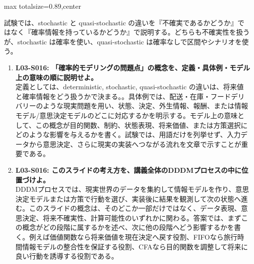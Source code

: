 \begin{minipage}[t]{0.58\textwidth}
\begin{adjustbox}{max totalsize={\textwidth}{0.89\textheight},center}
\begin{minipage}{\textwidth}
試験では、stochastic と quasi-stochastic の違いを『不確実であるかどうか』ではなく『確率情報を持っているかどうか』で説明する。どちらも不確実性を扱うが、stochastic は確率を使い、quasi-stochastic は確率なしで区間やシナリオを使う。\par{}\begin{enumerate}\item \textbf{L03-S016: 「確率的モデリングの問題点」の概念を、定義・具体例・モデル上の意味の順に説明せよ。}\\定義としては、deterministic, stochastic, quasi-stochastic の違いは、将来値と確率情報をどう扱うかで決まる。。具体例では、配送・在庫・フードデリバリーのような現実問題を用い、状態、決定、外生情報、報酬、または情報モデル/意思決定モデルのどこに対応するかを明示する。モデル上の意味として、この概念が目的関数、制約、状態表現、将来価値、または方策選択にどのような影響を与えるかを書く。試験では、用語だけを列挙せず、入力データから意思決定、さらに現実の実装へつながる流れを文章で示すことが重要である。\item \textbf{L03-S016: このスライドの考え方を、講義全体のDDDMプロセスの中に位置づけよ。}\\DDDMプロセスでは、現実世界のデータを集約して情報モデルを作り、意思決定モデルまたは方策で行動を選び、実装後に結果を観測して次の状態へ進む。このスライドの概念は、そのどこか一部だけではなく、データ表現、意思決定、将来不確実性、計算可能性のいずれかに関わる。答案では、まずこの概念がどの段階に属するかを述べ、次に他の段階へどう影響するかを書く。例えば価値関数なら将来価値を現在決定へ戻す役割、FIFOなら旅行時間情報モデルの整合性を保証する役割、CFAなら目的関数を調整して将来に良い行動を誘導する役割である。\end{enumerate}
\end{minipage}
\end{adjustbox}
\end{minipage}


